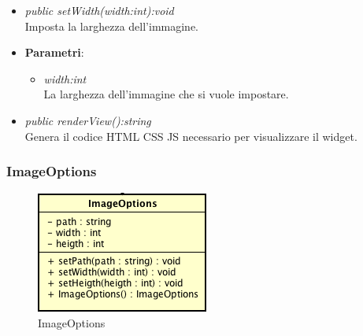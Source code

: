 \begin{itemize}
\begin{itemize}
{\begin{itemize}
		\end{itemize}}
	\item \textit{public setWidth(width:int):void}\\
	Imposta la larghezza dell'immagine.
		\item{\textbf{Parametri}: \begin{itemize}
		\item \textit{width:int}\\
		La larghezza dell'immagine che si vuole impostare.
		\end{itemize}}
	\item \textit{public renderView():string}\\
	Genera il codice HTML CSS JS necessario per visualizzare il widget.
	\end{itemize}
\end{itemize}

\subsubsection{ImageOptions}

\label{ImageOptions}
\begin{figure}[ht]
	\centering
	\includegraphics[scale=0.5]{Sezioni/SottosezioniST/img/ImageOptions.png}
	\caption{ImageOptions}
\end{figure}

